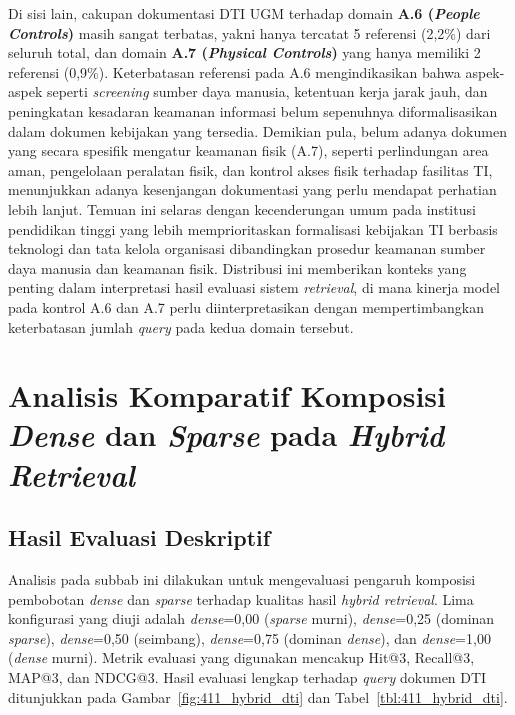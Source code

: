 Di sisi lain, cakupan dokumentasi DTI UGM terhadap domain \textbf{A.6 (\textit{People Controls})} masih sangat terbatas, yakni hanya tercatat 5 referensi (2,2\%) dari seluruh total, dan domain \textbf{A.7 (\textit{Physical Controls})} yang hanya memiliki 2 referensi (0,9\%). Keterbatasan referensi pada A.6 mengindikasikan bahwa aspek-aspek seperti \textit{screening} sumber daya manusia, ketentuan kerja jarak jauh, dan peningkatan kesadaran keamanan informasi belum sepenuhnya diformalisasikan dalam dokumen kebijakan yang tersedia. Demikian pula, belum adanya dokumen yang secara spesifik mengatur keamanan fisik (A.7), seperti perlindungan area aman, pengelolaan peralatan fisik, dan kontrol akses fisik terhadap fasilitas TI, menunjukkan adanya kesenjangan dokumentasi yang perlu mendapat perhatian lebih lanjut. Temuan ini selaras dengan kecenderungan umum pada institusi pendidikan tinggi yang lebih memprioritaskan formalisasi kebijakan TI berbasis teknologi dan tata kelola organisasi dibandingkan prosedur keamanan sumber daya manusia dan keamanan fisik. Distribusi ini memberikan konteks yang penting dalam interpretasi hasil evaluasi sistem \textit{retrieval}, di mana kinerja model pada kontrol A.6 dan A.7 perlu diinterpretasikan dengan mempertimbangkan keterbatasan jumlah \textit{query} pada kedua domain tersebut.

\section{Analisis Komparatif Komposisi \textit{Dense} dan \textit{Sparse} pada \textit{Hybrid Retrieval}}

\subsection{Hasil Evaluasi Deskriptif}

Analisis pada subbab ini dilakukan untuk mengevaluasi pengaruh komposisi pembobotan \textit{dense} dan \textit{sparse} terhadap kualitas hasil \textit{hybrid retrieval}. Lima konfigurasi yang diuji adalah \textit{dense}=0{,}00 (\textit{sparse} murni), \textit{dense}=0{,}25 (dominan \textit{sparse}), \textit{dense}=0{,}50 (seimbang), \textit{dense}=0{,}75 (dominan \textit{dense}), dan \textit{dense}=1{,}00 (\textit{dense} murni). Metrik evaluasi yang digunakan mencakup Hit@3, Recall@3, MAP@3, dan NDCG@3. Hasil evaluasi lengkap terhadap \textit{query} dokumen DTI ditunjukkan pada Gambar~\ref{fig:411_hybrid_dti} dan Tabel~\ref{tbl:411_hybrid_dti}.

